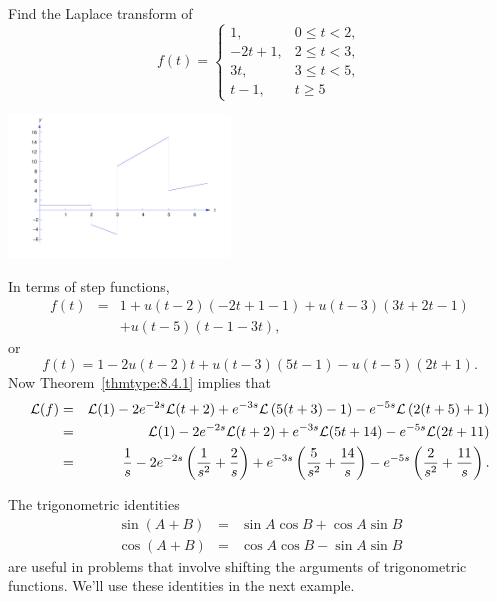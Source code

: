 \documentclass{ximera}
\begin{document}
\begin{example}\label{example:8.4.4}
 Find the Laplace transform of
\begin{equation} \label{eq:8.4.7}
f(t)=\left\{\begin{array}{cl}
 1,&0\leq t<2,\\
-2t+1,&2\leq t<3,\\
 3t,&3\leq t<5,\\
 t-1,&t\geq 5
\end{array}\right.
\end{equation}
\begin{image}
 \includegraphics[height=1.5in]{fig080403.jpg}
 \end{image}
\begin{explanation}
In terms of step functions,
\begin{eqnarray*}
f(t)&=&1+u(t-2)(-2t+1-1)+u(t-3)(3t+2t-1)\\
&&+u(t-5)(t-1-3t),
\end{eqnarray*}
or
$$
f(t)=1-2u(t-2)t+u(t-3)(5t-1)-u(t-5)(2t+1).
$$
Now Theorem~\ref{thmtype:8.4.1} implies that
\begin{eqnarray*}
{\cal L}(f)&=&{\cal L}(1)-2e^{-2s}{\cal L}(t+2)+e^{-3s}{\cal
L}\left(5(t+3)-1\right)-e^{-5s}{\cal L}\left(2(t+5)+1\right)\\
&=&{\cal L}(1)-2e^{-2s}{\cal L}(t+2)+e^{-3s}{\cal
L}(5t+14)-e^{-5s}{\cal L}(2t+11)\\
&=&\frac{1}{s}-2e^{-2s}\left(\frac{1}{s^2}+\frac{2}{s}\right)+
e^{-3s}\left(\frac{5}{s^2}+\frac{14}{s}\right)-e^{-5s}\left(\frac{2}{s^2}+\frac{11}{s}\right).
\end{eqnarray*}
\end{explanation}
\end{example}


 The trigonometric identities
\begin{eqnarray}
\sin (A+B)&=&\sin A\cos B+\cos A\sin B\label{eq:8.4.8}\\
\cos (A+B)&=&\cos A\cos B-\sin A\sin B\label{eq:8.4.9}
\end{eqnarray}
are useful in problems that involve shifting the arguments of
trigonometric functions. We'll use these identities in the next
example.
\end{document}
